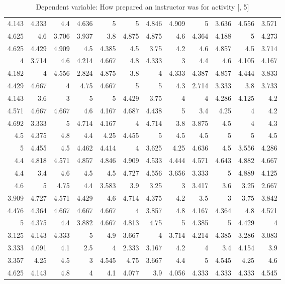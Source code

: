 \documentclass[10pt]{report}
\begin{document}
\begin{table}[!htbp]
\begin{tabular}{rrrrrrrrrrrr}
	4.143 & 4.333 & 4.4   & 4.636 & 5     & 5     & 4.846 & 4.909 & 5     & 3.636 & 4.556 & 3.571 \\
	4.625 & 4.6   & 3.706 & 3.937 & 3.8   & 4.875 & 4.875 & 4.6   & 4.364 & 4.188 & 5     & 4.273 \\
	4.625 & 4.429 & 4.909 & 4.5   & 4.385 & 4.5   & 3.75  & 4.2   & 4.6   & 4.857 & 4.5   & 3.714 \\
	4     & 3.714 & 4.6   & 4.214 & 4.667 & 4.8   & 4.333 & 3     & 4.4   & 4.6   & 4.105 & 4.167 \\
	4.182 & 4     & 4.556 & 2.824 & 4.875 & 3.8   & 4     & 4.333 & 4.387 & 4.857 & 4.444 & 3.833 \\
	4.429 & 4.667 & 4     & 4.75  & 4.667 & 5     & 5     & 4.3   & 2.714 & 3.333 & 3.8   & 3.733 \\
	4.143 & 3.6   & 3     & 5     & 5     & 4.429 & 3.75  & 4     & 4     & 4.286 & 4.125 & 4.2   \\
	4.571 & 4.667 & 4.667 & 4.6   & 4.167 & 4.687 & 4.438 & 5     & 3.4   & 4.25  & 4     & 4.2   \\
	4.692 & 3.333 & 5     & 4.714 & 4.167 & 4     & 4.714 & 3.8   & 3.875 & 4.5   & 4     & 4.3   \\
	4.5   & 4.375 & 4.8   & 4.4   & 4.25  & 4.455 & 5     & 4.5   & 4.5   & 5     & 5     & 4.5   \\
	5     & 4.455 & 4.5   & 4.462 & 4.414 & 4     & 3.625 & 4.25  & 4.636 & 4.5   & 3.556 & 4.286 \\
	4.4   & 4.818 & 4.571 & 4.857 & 4.846 & 4.909 & 4.533 & 4.444 & 4.571 & 4.643 & 4.882 & 4.667 \\
	4.4   & 3.4   & 4.6   & 4.5   & 4.5   & 4.727 & 4.556 & 3.656 & 3.333 & 5     & 4.889 & 4.125 \\
	4.6   & 5     & 4.75  & 4.4   & 3.583 & 3.9   & 3.25  & 3     & 3.417 & 3.6   & 3.25  & 2.667 \\
	3.909 & 4.727 & 4.571 & 4.429 & 4.6   & 4.714 & 4.375 & 4.2   & 3.5   & 3     & 3.75  & 3.842 \\
	4.476 & 4.364 & 4.667 & 4.667 & 4.667 & 4     & 3.857 & 4.8   & 4.167 & 4.364 & 4.8   & 4.571 \\
	5     & 4.375 & 4.4   & 3.882 & 4.667 & 4.813 & 4.75  & 5     & 4.385 & 5     & 4.429 & 4     \\
	3.125 & 4.143 & 4.333 & 5     & 4.9   & 3.667 & 4     & 3.714 & 4.214 & 4.385 & 3.286 & 3.083 \\
	3.333 & 4.091 & 4.1   & 2.5   & 4     & 2.333 & 3.167 & 4.2   & 4     & 3.4   & 4.154 & 3.9   \\
	3.357 & 4.25  & 4.5   & 3     & 4.545 & 4.75  & 3.667 & 4.4   & 5     & 4.545 & 4.25  & 4.6   \\
	4.625 & 4.143 & 4.8   & 4     & 4.1   & 4.077 & 3.9   & 4.056 & 4.333 & 4.333 & 4.333 & 4.545 \\
	\hline
	\end{tabular}

    \caption{Dependent variable: How prepared an instructor was for activity [, 5]}
\end{table}
\end{document}
